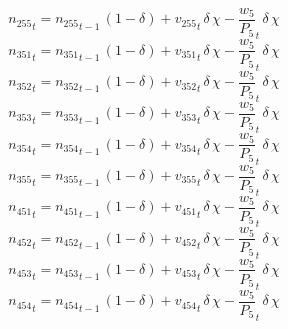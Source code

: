 \begin{dmath}
{{n_{255}}}_{t}={{n_{255}}}_{t-1}\, \left(1-{{\delta}}\right)+{{v_{255}}}_{t}\, {{\delta}}\, {{\chi}}-{{\frac{w_{5}}{P_{5}}}}_{t}\, {{\delta}}\, {{\chi}}
\end{dmath}
\begin{dmath}
{{n_{351}}}_{t}={{n_{351}}}_{t-1}\, \left(1-{{\delta}}\right)+{{v_{351}}}_{t}\, {{\delta}}\, {{\chi}}-{{\frac{w_{5}}{P_{5}}}}_{t}\, {{\delta}}\, {{\chi}}
\end{dmath}
\begin{dmath}
{{n_{352}}}_{t}={{n_{352}}}_{t-1}\, \left(1-{{\delta}}\right)+{{v_{352}}}_{t}\, {{\delta}}\, {{\chi}}-{{\frac{w_{5}}{P_{5}}}}_{t}\, {{\delta}}\, {{\chi}}
\end{dmath}
\begin{dmath}
{{n_{353}}}_{t}={{n_{353}}}_{t-1}\, \left(1-{{\delta}}\right)+{{v_{353}}}_{t}\, {{\delta}}\, {{\chi}}-{{\frac{w_{5}}{P_{5}}}}_{t}\, {{\delta}}\, {{\chi}}
\end{dmath}
\begin{dmath}
{{n_{354}}}_{t}={{n_{354}}}_{t-1}\, \left(1-{{\delta}}\right)+{{v_{354}}}_{t}\, {{\delta}}\, {{\chi}}-{{\frac{w_{5}}{P_{5}}}}_{t}\, {{\delta}}\, {{\chi}}
\end{dmath}
\begin{dmath}
{{n_{355}}}_{t}={{n_{355}}}_{t-1}\, \left(1-{{\delta}}\right)+{{v_{355}}}_{t}\, {{\delta}}\, {{\chi}}-{{\frac{w_{5}}{P_{5}}}}_{t}\, {{\delta}}\, {{\chi}}
\end{dmath}
\begin{dmath}
{{n_{451}}}_{t}={{n_{451}}}_{t-1}\, \left(1-{{\delta}}\right)+{{v_{451}}}_{t}\, {{\delta}}\, {{\chi}}-{{\frac{w_{5}}{P_{5}}}}_{t}\, {{\delta}}\, {{\chi}}
\end{dmath}
\begin{dmath}
{{n_{452}}}_{t}={{n_{452}}}_{t-1}\, \left(1-{{\delta}}\right)+{{v_{452}}}_{t}\, {{\delta}}\, {{\chi}}-{{\frac{w_{5}}{P_{5}}}}_{t}\, {{\delta}}\, {{\chi}}
\end{dmath}
\begin{dmath}
{{n_{453}}}_{t}={{n_{453}}}_{t-1}\, \left(1-{{\delta}}\right)+{{v_{453}}}_{t}\, {{\delta}}\, {{\chi}}-{{\frac{w_{5}}{P_{5}}}}_{t}\, {{\delta}}\, {{\chi}}
\end{dmath}
\begin{dmath}
{{n_{454}}}_{t}={{n_{454}}}_{t-1}\, \left(1-{{\delta}}\right)+{{v_{454}}}_{t}\, {{\delta}}\, {{\chi}}-{{\frac{w_{5}}{P_{5}}}}_{t}\, {{\delta}}\, {{\chi}}
\end{dmath}
